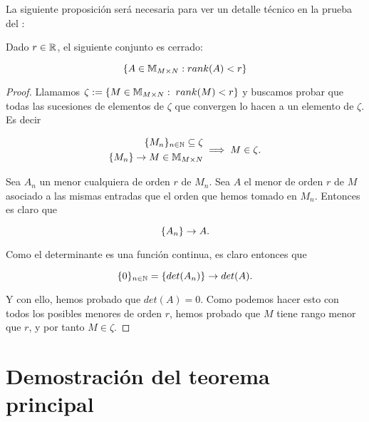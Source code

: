 La siguiente proposición será necesaria para ver un detalle técnico en la prueba del :

\begin{proposicion}
    Dado $r \in \mathbb{R}$, el siguiente conjunto es cerrado:

    \begin{equation}
        \{ A \in \mathbb{M}_{M \times N}: rank(A) < r  \}
    \end{equation}
\end{proposicion}

\begin{proof}
    Llamamos $\zeta := \{ M \in \mathbb{M}_{M \times N}: \; rank(M) < r \}$ y buscamos probar que todas las sucesiones de elementos de $\zeta$ que convergen lo hacen a un elemento de $\zeta$. Es decir

    \begin{equation}
        \begin{split}
            \{ M_n \}_{n \in \mathbb{N}} \subseteq \zeta \\
            \{ M_n \} \to M \in \mathbb{M}_{M \times N} \\
        \end{split}
        \implies M \in \zeta.
    \end{equation}

    Sea $A_n$ un menor cualquiera de orden $r$ de $M_n$. Sea $A$ el menor de orden $r$ de $M$ asociado a las mismas entradas que el orden que hemos tomado en $M_n$. Entonces es claro que

    \begin{equation}
        \{ A_n \} \to A.
    \end{equation}

    Como el determinante es una función continua, es claro entonces que

    \begin{equation}
        \{ 0 \}_{n \in \mathbb{N}} = \{ det(A_n) \} \to det(A).
    \end{equation}

    Y con ello, hemos probado que $det(A) = 0$. Como podemos hacer esto con todos los posibles menores de orden $r$, hemos probado que $M$ tiene rango menor que $r$, y por tanto $M \in \zeta$.
\end{proof}

\section{Demostración del teorema principal}

